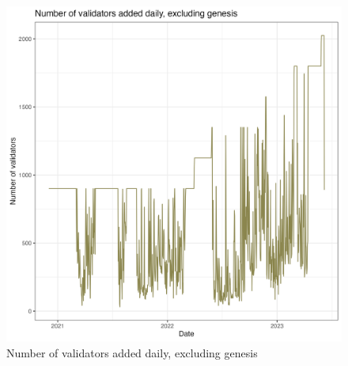 \documentclass[UTF8]{article}
\begin{document}
{\begin{figure}[htbp]
\begin{center}
\includegraphics[width=\linewidth]{images/daily_validator_plot_no_genesis_no_smoothing_230607}             %
\caption{Number of validators added daily, excluding genesis}
\label{fig:dailyvalidator2}
\end{center}
\end{figure}

}
\end{document}
